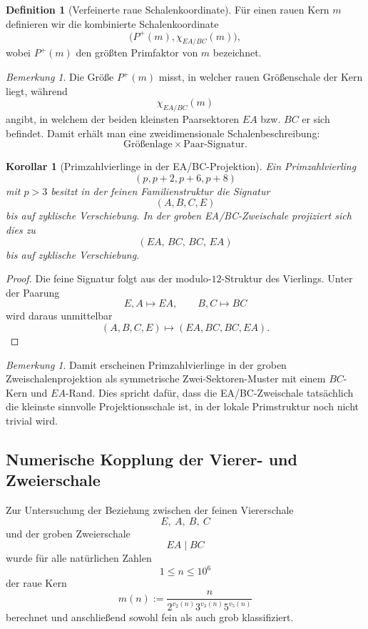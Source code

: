 \documentclass[11pt,a4paper]{article}
\newtheorem{korollar}[satz]{Korollar}
\theoremstyle{definition}
\newtheorem{definition}[satz]{Definition}
\theoremstyle{remark}
\newtheorem{bemerkung}[satz]{Bemerkung}
\begin{document}
	\begin{definition}[Verfeinerte raue Schalenkoordinate]
		Für einen rauen Kern \(m\) definieren wir die kombinierte Schalenkoordinate
		\[
		\boxed{
			\bigl(P^+(m),\chi_{EA/BC}(m)\bigr),
		}
		\]
		wobei \(P^+(m)\) den größten Primfaktor von \(m\) bezeichnet.
	\end{definition}
	
	\begin{bemerkung}
		Die Größe \(P^+(m)\) misst, in welcher rauen Größenschale der Kern liegt, während
		\[
		\chi_{EA/BC}(m)
		\]
		angibt, in welchem der beiden kleinsten Paarsektoren \(EA\) bzw. \(BC\) er sich befindet.
		Damit erhält man eine zweidimensionale Schalenbeschreibung:
		\[
		\text{Größenlage}\times\text{Paar-Signatur}.
		\]
	\end{bemerkung}
	
	\begin{korollar}[Primzahlvierlinge in der EA/BC-Projektion]
		\label{kor:vierling_eabc_zweischale}
		Ein Primzahlvierling
		\[
		(p,p+2,p+6,p+8)
		\]
		mit \(p>3\) besitzt in der feinen Familienstruktur die Signatur
		\[
		(A,B,C,E)
		\]
		bis auf zyklische Verschiebung. In der groben EA/BC-Zweischale projiziert sich dies zu
		\[
		(EA,\,BC,\,BC,\,EA)
		\]
		bis auf zyklische Verschiebung.
	\end{korollar}
	
	\begin{proof}
		Die feine Signatur folgt aus der modulo-\(12\)-Struktur des Vierlings. Unter der Paarung
		\[
		E,A\mapsto EA,
		\qquad
		B,C\mapsto BC
		\]
		wird daraus unmittelbar
		\[
		(A,B,C,E)\mapsto (EA,BC,BC,EA).
		\]
	\end{proof}
	
	\begin{bemerkung}
		Damit erscheinen Primzahlvierlinge in der groben Zweischalenprojektion als symmetrische
		Zwei-Sektoren-Muster mit einem \(BC\)-Kern und \(EA\)-Rand. Dies spricht dafür, dass die
		EA/BC-Zweischale tatsächlich die kleinste sinnvolle Projektionsschale ist, in der
		lokale Primstruktur noch nicht trivial wird.
	\end{bemerkung}
	
	\subsection{Numerische Kopplung der Vierer- und Zweierschale}
	
	Zur Untersuchung der Beziehung zwischen der feinen Viererschale
	\[
	E,\ A,\ B,\ C
	\]
	und der groben Zweierschale
	\[
	EA\mid BC
	\]
	wurde für alle natürlichen Zahlen
	\[
	1\le n\le 10^6
	\]
	der raue Kern
	\[
	m(n):=\frac{n}{2^{v_2(n)}3^{v_3(n)}5^{v_5(n)}}
	\]
	berechnet und anschließend sowohl fein als auch grob klassifiziert.
	
\end{document}
